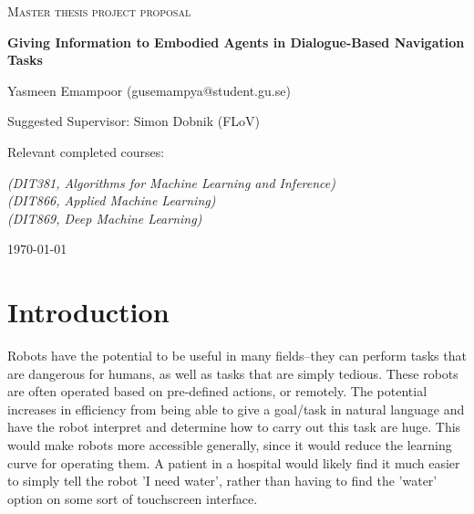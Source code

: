\documentclass{article}
\begin{document}
\begin{titlepage}
  

\centering
  
  
{\scshape\LARGE Master thesis project proposal\\}
  
\vspace{0.5cm}
  
{\huge\bfseries Giving Information to Embodied Agents in Dialogue-Based Navigation Tasks\\}
  
\vspace{2cm}
  
{\Large Yasmeen Emampoor (gusemampya@student.gu.se)\\}
  
\vspace{1.0cm}
  
{\large Suggested Supervisor: Simon Dobnik (FLoV)\\}
  
\vspace{1.5cm}
  
  
{\large Relevant completed courses:\par}
{\itshape (DIT381, Algorithms for Machine Learning and Inference)\\ (DIT866, Applied Machine Learning) \\ (DIT869, Deep Machine Learning)}
  
\vspace{1.5cm}
  
\vfill

\vfill
  
{\large \today\\} 


\end{titlepage}
\section{Introduction}
Robots have the potential to be useful in many fields–they can perform tasks
that are dangerous for humans, as well as tasks that are simply tedious. These
robots are often operated based on pre-defined actions, or remotely. The potential increases in efficiency from being able to give a goal/task in natural language
and have the robot interpret and determine how to carry out this task are huge.
This would make robots more accessible generally, since it would reduce the
learning curve for operating them. A patient in a hospital would likely find it much easier to simply tell the robot 'I need water', rather than having to find the 'water' option on some sort of touchscreen interface.
\end{document}

